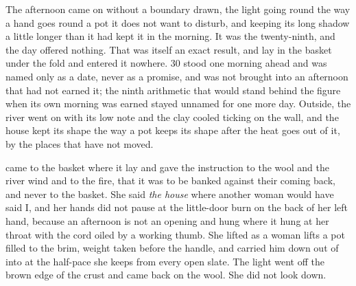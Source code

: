 The afternoon came on without a boundary drawn, the light going round  the way a hand goes round a pot it does not want to disturb, and  keeping its long shadow a little longer than it had kept it in the morning. It was the twenty-ninth, and the day offered nothing. That was itself an exact result, and  lay in the basket under the fold and entered it nowhere.  30 stood one morning ahead and was named only as a date, never as a promise, and was not brought into an afternoon that had not earned it; the ninth arithmetic that would stand behind the figure when its own morning was earned stayed unnamed for one more day. Outside, the river went on with its low note and the clay cooled ticking on the wall, and the house kept its shape the way a pot keeps its shape after the heat goes out of it, by the places that have not moved.

 came to the basket where it lay and gave the instruction to the wool and the river wind and to the fire, that it was to be banked against their coming back, and never to the basket. She said \emph{the house} where another woman would have said I, and her hands did not pause at the little-door burn on the back of her left hand, because an afternoon is not an opening and  hung where it hung at her throat with the cord oiled by a working thumb. She lifted as a woman lifts a pot filled to the brim, weight taken before the handle, and carried him down out of  into  at the half-pace she keeps from every open slate. The light went off the brown edge of the crust and came back on the wool. She did not look down.

